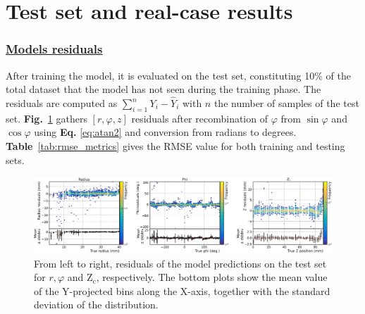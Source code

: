

\section{Test set and real-case results}
\label{sec:results}
\subsubsection*{\underline{Models residuals}}

After training the model, it is evaluated on the test set, constituting 10\% of the total dataset that the model has not seen during the training phase. The residuals are computed as $\sum_{i=1}^n Y_i - \hat Y_i$ 
with $n$ the number of samples of the test set. \textbf{Fig.}~\ref{fig:all_residuals} gathers $[r, \varphi,z]$ residuals after recombination of $\varphi$ from $\sin \varphi$ and $\cos \varphi$ using \textbf{Eq.} \ref{eq:atan2} and conversion from radians to degrees. \textbf{Table}~\ref{tab:rmse_metrics} gives the RMSE value for both training and testing sets.
\begin{figure}
\includegraphics[width=\textwidth]{images/residuals_subplots_grouped.eps}
\caption{From left to right, residuals of the model predictions on the test set for $r, \varphi$ and $\text{Z}_\text{c}$, respectively. The bottom plots show the mean value of the Y-projected bins along the X-axis, together with the standard deviation of the distribution.}
\label{fig:all_residuals}       %
\end{figure}

